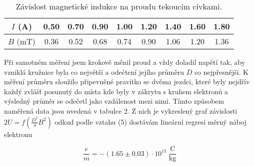 \documentclass[a4paper,11pt]{article}
\begin{document}
\begin{table}[h]
    \centering
    \begin{tabular}{| c | c c c c c c c c |}
        \hline 
    $ I $ (A) & 0.50 & 0.70 & 0.90 & 1.00 & 1.20 & 1.40 & 1.60 & 1.80 \\
    \hline
    $ B $ (mT) & 0.36 & 0.52 & 0.68 & 0.74 & 0.90 & 1.06 & 1.20 & 1.36 \\
    \hline
    \end{tabular}

    \caption{Závislost magnetické indukce na proudu tekoucím cívkami.}
\end{table}

Při samotném měření jsem krokově měnil proud a vždy doladil napětí tak, aby vzniklá kružnice byla co největší a odečtení jejího průměru $ D $ co nejpřesnější. K měření průměru sloužilo připevněné pravítko se dvěma jezdci, které byly nejdřív každý zvlášť posunutý do místa kde byly v zákrytu s kruhem elektronů a výsledný průměr se odečetl jako vzdálenost mezi nimi. Tímto způsobem naměřená data jsou uvedená v tabulce 2. Z nich je vykreslený graf závislosti $ 2U = f( \frac{D^2}{4} B^2) $ odkud podle vztahu (5) dostávám lineární regresí měrný náboj elektronu

\begin{equation}
\frac{e}{m} = -(1.65 \pm  0.03) \cdot 10^{11} \  \frac{\text{C}}{\text{kg}}
\end{equation}
\end{document}
